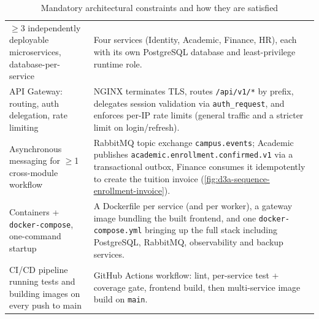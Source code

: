 \begin{table}[H]
  \centering
  \caption{Mandatory architectural constraints and how they are satisfied}
  \label{tab:constraints}
  \begin{tabularx}{\linewidth}{L{5.1cm}X}
    \toprule
     &  \\
    \midrule
    $\geq$3 independently deployable microservices, database-per-service &
      Four services (Identity, Academic, Finance, HR), each with its own
      PostgreSQL database and least-privilege runtime role. \\
    API Gateway: routing, auth delegation, rate limiting &
      NGINX terminates TLS, routes \texttt{/api/v1/*} by prefix, delegates
      session validation via \texttt{auth\_request}, and enforces per-IP rate
      limits (general traffic and a stricter limit on login/refresh). \\
    Asynchronous messaging for $\geq$1 cross-module workflow &
      RabbitMQ topic exchange \texttt{campus.events}; Academic publishes
      \texttt{academic.enrollment.confirmed.v1} via a transactional outbox,
      Finance consumes it idempotently to create the tuition invoice
      (\cref{fig:d3a-sequence-enrollment-invoice}). \\
    Containers + \texttt{docker-compose}, one-command startup &
      A Dockerfile per service (and per worker), a gateway image bundling the
      built frontend, and one \texttt{docker-compose.yml} bringing up the
      full stack including PostgreSQL, RabbitMQ, observability and backup
      services. \\
    CI/CD pipeline running tests and building images on every push to main &
      GitHub Actions workflow: lint, per-service test + coverage gate, frontend
      build, then multi-service image build on \texttt{main}. \\
    \bottomrule
  \end{tabularx}
\end{table}

